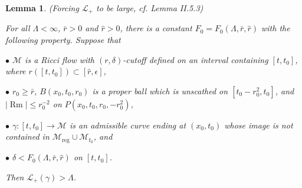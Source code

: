 \documentclass[12pt]{amsart}
\renewcommand{\L}{{\mathcal L}}
\newcommand{\La}{\Lambda}
\newcommand{\M}{{\mathcal M}}
\newcommand{\reg}{\operatorname{reg}}
\newcommand{\Rm}{\operatorname{Rm}}
\newcommand{\de}{\delta}
\newcommand{\eps}{\epsilon}
\newcommand{\ga}{\gamma}
\newcommand{\ra}{\rightarrow}
\numberwithin{equation}{section}
\theoremstyle{plain}
\newtheorem{lemma}[equation]{Lemma}
\theoremstyle{definition}
\theoremstyle{remark}
\begin{document}
\begin{lemma}(Forcing $\L_+$ to be large, cf. Lemma II.5.3)
\label{lplusbig}

For all $\La< \infty$, $\bar r>0$ and $\hat r>0$,
there is  a constant  $F_0=F_0(\La,\bar r,\hat r)$
with the following property.  Suppose that

$\bullet$  $\M$ is a Ricci flow  with $(r,\de)$-cutoff
defined on an interval containing $[t,t_0]$, where 
 $r([t,t_0])\subset [\hat r,\eps]$,

$\bullet$ $r_0\geq \bar r$, 
 $B(x_0,t_0,r_0)$ is a proper ball which is unscathed on $[t_0-r_0^2,t_0]$, and
$|\Rm|\leq r_0^{-2}$ on $P(x_0,t_0,r_0,-r_0^2)$,

$\bullet$ $\ga:[t,t_0]\ra\M$ is an admissible curve
ending at $(x_0, t_0)$
whose image 
is not contained in $\M_{\reg}\cup\M_{t_0}$, and

$\bullet$ $\de < F_0(\La,\bar r,\hat r)$
on $[t,t_0]$.  

\noindent
Then $\L_+(\ga)>\La$. 
\end{lemma}
\end{document}
